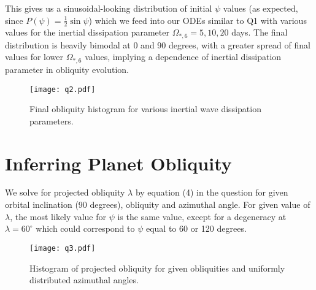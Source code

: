 \documentclass{article}
\begin{document}
This gives us a sinusoidal-looking distribution of initial $\psi$ values (as expected, since $P(\psi)=\frac{1}{2}\sin{\psi}$) which we feed into our ODEs similar to Q1 with various values for the inertial dissipation parameter $\Omega_{*,6}=5,10,20$ days. The final distribution is heavily bimodal at 0 and 90 degrees, with a greater spread of final values for lower $\Omega_{*,6}$ values, implying a dependence of inertial dissipation parameter in obliquity evolution.

\begin{figure}[H]
    \centering
    \texttt{[image: q2.pdf]}
    \caption{Final obliquity histogram for various inertial wave dissipation parameters.}
\end{figure}

\pagebreak

\section{Inferring Planet Obliquity}
 
We solve for projected obliquity $\lambda$ by equation (4) in the question for given orbital inclination (90 degrees), obliquity and azimuthal angle. For given value of $\lambda$, the most likely value for $\psi$ is the same value, except for a degeneracy at $\lambda=60^\circ$ which could correspond to $\psi$ equal to 60 or 120 degrees.

\begin{figure}[H]
    \centering
    \texttt{[image: q3.pdf]}
    \caption{Histogram of projected obliquity for given obliquities and uniformly distributed azimuthal angles.}
\end{figure}
\end{document}
